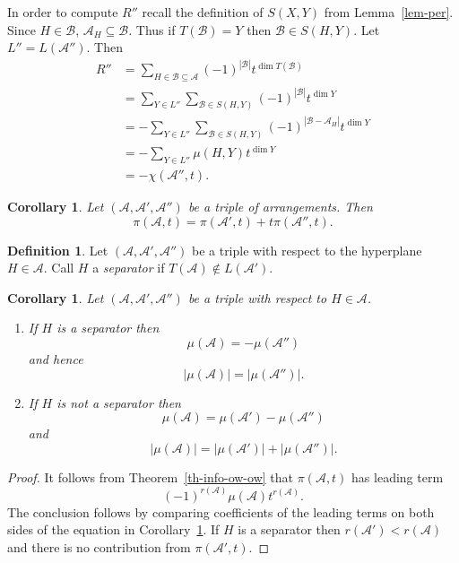 \documentclass{article}
\newtheorem{cor}[thm]{Corollary}
\theoremstyle{definition}
\newtheorem{defn}{Definition}[section]
\theoremstyle{remark}
\newcommand{\thmref}[1]{Theorem~\ref{#1}}
\newcommand{\lemref}[1]{Lemma~\ref{#1}}
\newcommand{\A}{\mathcal{A}}
\newcommand{\BB}{\mathcal{B}}
\newcommand{\envert}[1]{\left\lvert#1\right\rvert}
\let\abs=\envert
\begin{document}
In order to compute $R''$ recall the definition
of $S(X,Y)$ from \lemref{lem-per}. Since $H \in \BB$,
$\A_{H} \subseteq \BB$. Thus if $T(\BB) = Y$ then
$\BB \in S(H,Y)$. Let $L'' = L(\A'')$. Then
\begin{equation}\label{E_SXgYy}
\begin{split}
R''&= \sum_{H\in \BB \subseteq \A} (-1)^{\abs{\BB}}
t^{\dim T(\BB)}\\
&= \sum_{Y \in L''} \sum_{\BB \in S(H,Y)}
(-1)^{\abs{\BB}}t^{\dim Y} \\
&= -\sum_{Y \in L''} \sum_{\BB \in S(H,Y)} (-1)^
{\abs{\BB - \A_{H}}} t^{\dim Y} \\
&= -\sum_{Y \in L''} \mu (H,Y)t^{\dim Y} \\
&= -\chi (\A '',t).
\end{split}
\end{equation}

\begin{cor}\label{tripleA}
Let $(\A,\A',\A'')$ be a triple of arrangements. Then
\[ \pi (\A,t) = \pi (\A',t) + t \pi (\A'',t). \]
\end{cor}

\begin{defn}
Let $(\A,\A',\A'')$ be a triple with respect to
the hyperplane $H \in \A$. Call $H$ a \textit{separator}
if $T(\A) \not\in L(\A')$.
\end{defn}

\begin{cor}\label{nsep}
Let $(\A,\A',\A'')$ be a triple with respect to $H \in \A$.
\begin{enumerate}
\renewcommand{\labelenumi}{(\roman{enumi})}
\item
If $H$ is a separator then
\[ \mu (\A) = - \mu (\A'') \]
and hence
\[ \abs{\mu (\A)} = \abs{ \mu (\A'')}. \]

\item If $H$ is not a separator then
\[\mu (\A) = \mu (\A') - \mu (\A'') \]
and
\[ \abs{\mu (\A)} = \abs{\mu (\A')} + \abs{\mu (\A'')}. \]
\end{enumerate}
\end{cor}

\begin{proof}
It follows from \thmref{th-info-ow-ow} that $\pi(\A,t)$
has leading term
\[(-1)^{r(\A)}\mu (\A)t^{r(\A)}.\]
The conclusion
follows by comparing coefficients of the leading
terms on both sides of the equation in
Corollary~\ref{tripleA}. If $H$ is a separator then
$r(\A') < r(\A)$ and there is no contribution
from $\pi (\A',t)$.
\end{proof}
\end{document}
